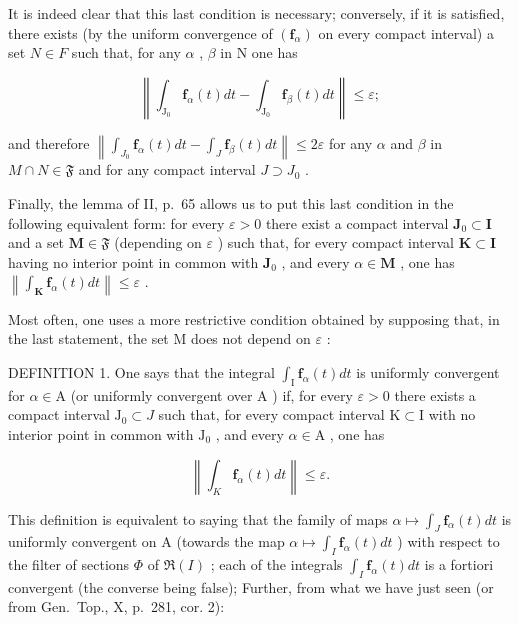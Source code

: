 It is indeed clear that this last condition is necessary; conversely, if it is satisfied, there exists (by the uniform convergence of \((\mathbf{f}_{\alpha})\) on every compact interval) a set \(N \in F\) such that, for any \(\alpha\) , \(\beta\) in N one has

\[
\left\| \int_ {\mathrm{J} _ {0}} \mathbf {f} _ {\alpha} (t) d t - \int_ {\mathrm{J} _ {0}} \mathbf {f} _ {\beta} (t) d t \right\| \leqslant \varepsilon ;\tag{6}
\]

and therefore \(\left\|\int_{J_{0}}\mathbf{f}_{\alpha}(t)dt-\int_{J}\mathbf{f}_{\beta}(t)dt\right\|\leqslant2\varepsilon\) for any \(\alpha\) and \(\beta\) in \(M\cap N\in\mathfrak{F}\) and for any compact interval \(J\supset J_{0}\) .

Finally, the lemma of II, p.~65 allows us to put this last condition in the following equivalent form: for every \(\varepsilon > 0\) there exist a compact interval \(\mathbf{J}_0 \subset \mathbf{I}\) and a set \(\mathbf{M} \in \mathfrak{F}\) (depending on \(\varepsilon\) ) such that, for every compact interval \(\mathbf{K} \subset \mathbf{I}\) having no interior point in common with \(\mathbf{J}_0\) , and every \(\alpha \in \mathbf{M}\) , one has \(\left\| \int_{\mathbf{K}} \mathbf{f}_{\alpha}(t) dt \right\| \leqslant \varepsilon\) .

Most often, one uses a more restrictive condition obtained by supposing that, in the last statement, the set M does not depend on \(\varepsilon\) :

DEFINITION 1. One says that the integral \(\int_{\mathrm{I}} \mathbf{f}_{\alpha}(t) dt\) is uniformly convergent for \(\alpha \in \mathrm{A}\) (or uniformly convergent over \(\mathrm{A}\) ) if, for every \(\varepsilon > 0\) there exists a compact interval \(\mathrm{J}_0 \subset J\) such that, for every compact interval \(\mathrm{K} \subset \mathrm{I}\) with no interior point in common with \(\mathrm{J}_0\) , and every \(\alpha \in \mathrm{A}\) , one has

\[
\left\| \int_ {K} \mathbf {f} _ {\alpha} (t) d t \right\| \leqslant \varepsilon .\tag{7}
\]

This definition is equivalent to saying that the family of maps \(\alpha\mapsto\int_{J}\mathbf{f}_{\alpha}(t)dt\) is uniformly convergent on A (towards the map \(\alpha\mapsto\int_{I}\mathbf{f}_{\alpha}(t)dt\) ) with respect to the filter of sections \(\Phi\) of \(\Re(I)\) ; each of the integrals \(\int_{I}\mathbf{f}_{\alpha}(t)dt\) is a fortiori convergent (the converse being false); Further, from what we have just seen (or from Gen.~Top., X, p.~281, cor. 2):

